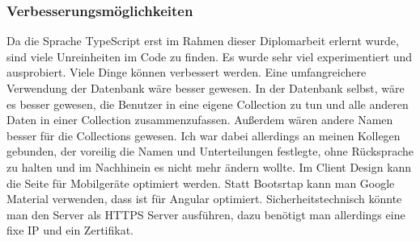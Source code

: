 \subsubsection{Verbesserungsmöglichkeiten}
\label{sec:verbesserung}
Da die Sprache TypeScript erst im Rahmen dieser Diplomarbeit erlernt wurde, sind viele Unreinheiten im Code zu finden. Es wurde sehr viel experimentiert und ausprobiert. Viele Dinge können verbessert werden. Eine umfangreichere Verwendung der Datenbank wäre besser gewesen. In der Datenbank selbst, wäre es besser gewesen, die Benutzer in eine eigene Collection zu tun und alle anderen Daten in einer Collection zusammenzufassen. Außerdem wären andere Namen besser für die Collections gewesen. Ich war dabei allerdings an meinen Kollegen gebunden, der voreilig die Namen und Unterteilungen festlegte, ohne Rücksprache zu halten und im Nachhinein es nicht mehr ändern wollte. Im Client Design kann die Seite für Mobilgeräte optimiert werden. Statt Bootsrtap kann man Google Material verwenden, dass ist für Angular optimiert. Sicherheitstechnisch könnte man den Server als \ac{HTTPS} Server ausführen, dazu benötigt man allerdings eine fixe IP und ein Zertifikat.